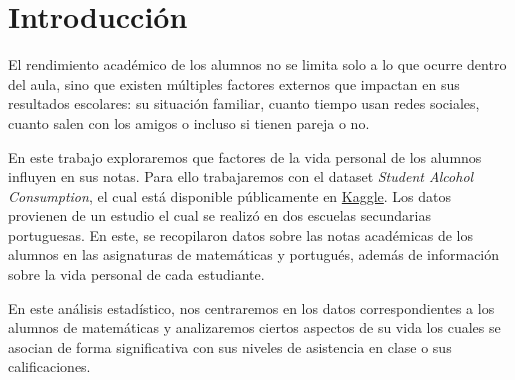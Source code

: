 \chapter{Introducción}

El rendimiento académico de los alumnos no se limita solo a lo que ocurre dentro del aula, sino que existen múltiples factores externos que impactan en sus resultados escolares: su situación familiar, cuanto tiempo usan redes sociales, cuanto salen con los amigos o incluso si tienen pareja o no.

En este trabajo exploraremos que factores de la vida personal de los alumnos influyen en sus notas. Para ello trabajaremos con el dataset \textit{Student Alcohol Consumption}, el cual está disponible públicamente en \href{https://www.kaggle.com/datasets/uciml/student-alcohol-consumption}{Kaggle}. Los datos provienen de un estudio \cite{cortez2008using} el cual se realizó en dos escuelas secundarias portuguesas. En este, se recopilaron datos sobre las notas académicas de los alumnos en las asignaturas de matemáticas y portugués, además de información sobre la vida personal de cada estudiante. 

En este análisis estadístico, nos centraremos en los datos correspondientes a los alumnos de matemáticas y analizaremos ciertos aspectos de su vida los cuales se asocian de forma significativa con sus niveles de asistencia en clase o sus calificaciones.

\pagebreak

